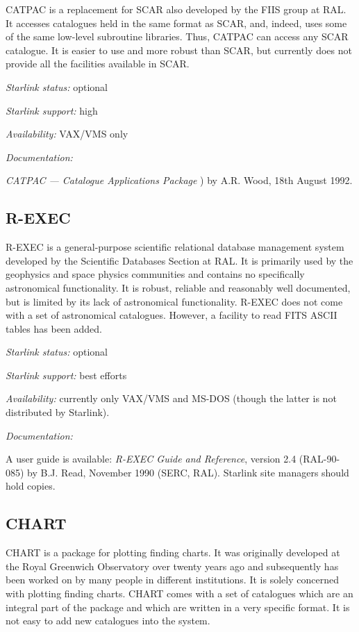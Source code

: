 CATPAC is a replacement for SCAR also developed by the FIIS group at
RAL. It accesses catalogues held in the same format as SCAR, and, 
indeed, uses some of the same low-level subroutine libraries. Thus, 
CATPAC can access any SCAR catalogue. It is easier to use and more 
robust than SCAR, but currently does not provide all the facilities 
available in SCAR.

{\it Starlink status:} optional

{\it Starlink support:} high

{\it Availability:} VAX/VMS only

{\it Documentation:}

{\it CATPAC --- Catalogue Applications Package}
) by A.R. Wood,
18th August 1992.

\subsection{R-EXEC}

R-EXEC is a general-purpose scientific relational database management 
system developed by the Scientific Databases Section at RAL. It is 
primarily used by the geophysics and space physics communities and 
contains no specifically astronomical functionality. It is robust, 
reliable and reasonably well documented, but is limited by its lack of 
astronomical functionality. R-EXEC does not come with a set of 
astronomical catalogues. However, a facility to read FITS ASCII tables 
has been added.

{\it Starlink status:} optional

{\it Starlink support:} best efforts

{\it Availability: } currently only VAX/VMS and MS-DOS (though the 
latter is not distributed by Starlink).

{\it Documentation: }

A user guide is available: {\it R-EXEC Guide and Reference}, version 
2.4 (RAL-90-085) by B.J. Read, November 1990 (SERC, RAL). Starlink site
managers should hold copies.

\subsection{CHART}

CHART is a package for plotting finding charts. It was originally 
developed at the Royal Greenwich Observatory over twenty years ago and
subsequently has been worked on by many people in different 
institutions. It is solely concerned with plotting finding charts. CHART
comes with a set of catalogues which are an integral part of the package
and which are written in a very specific format. It is not easy to add 
new catalogues into the system.

